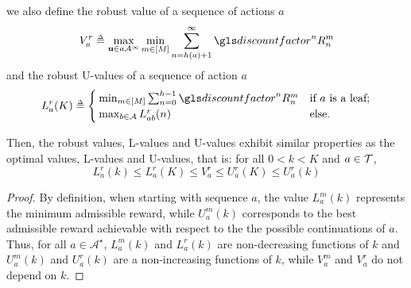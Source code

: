 \begin{subappendices}
\begin{lemma}
\begin{leftbar}[lemmabar]
		we also define the robust value of a sequence of actions $a$
		\begin{equation}
		\label{eq:max_vr}
		V_a^r \eqdef \max_{\bu \in a\mathcal{A^\infty}} \min_{m\in[M]} \sum_{n=h(a)+1}^\infty \discount^n R^m_n
		\end{equation}
		and the robust U-values of a sequence of action $a$
		\begin{equation}
		\label{eq:ur}
		L_a^r(K)  \eqdef
		\begin{cases}
		\min_{m\in[M]} \sum_{n=0}^{h-1} \discount^n R_n^m &\text{if } a \text{ is a leaf;}\\
		\max_{b\in\mathcal{A}} L_{ab}^r(n) & \text{else.}
		\end{cases}
		\end{equation}
		
		Then, the robust values, L-values and U-values exhibit similar properties as the optimal values, L-values and U-values, that is: for all $0 < k < K$ and $a\in\mathcal{T}$,
		\begin{equation}
		L^r_a(k) \leq L^r_a(K) \leq V^r_a \leq U^r_a(K) \leq U^r_a(k)
		\end{equation}
		\end{leftbar}
	\end{lemma}
	\begin{proof}
		By definition, when starting with sequence $a$, the value $L_a^m(k)$ represents the minimum admissible reward, while $U_a^m(k)$ corresponds to the best admissible reward achievable with respect to the the possible continuations of $a$. Thus, for all $a\in\mathcal{A}^{\star}$, $L_a^m(k)$ and $L_a^r(k)$ are non-decreasing functions of $k$ and $U_a^m(k)$ and $U_a^r(k)$ are a non-increasing functions of $k$, while $V_a^m$ and $V_a^r$ do not depend on $k$.
		

\end{proof}
\end{subappendices}
